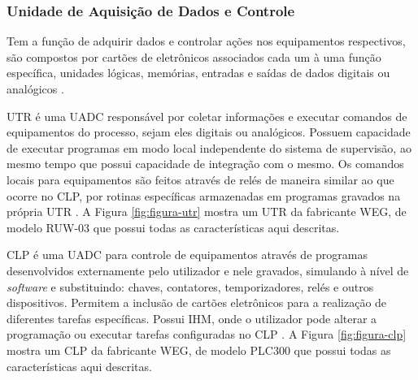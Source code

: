     \subsubsection{Unidade de Aquisição de Dados e Controle}
    \label{sec:uadc}

        Tem a função de adquirir dados e controlar ações nos equipamentos respectivos, são compostos por cartões de eletrônicos associados cada um à uma função específica, unidades lógicas, memórias,  entradas e saídas de dados digitais ou analógicos \cite{mamede-instalacoes}.
        
    \label{sec:utr}

       \gls{UTR} é uma \gls{UADC} responsável por coletar informações e executar comandos de equipamentos do processo, sejam eles digitais ou analógicos. Possuem capacidade de executar programas em modo local independente do sistema de supervisão, ao mesmo tempo que possui capacidade de integração com o mesmo. Os comandos locais para equipamentos são feitos através de relés de maneira similar ao que ocorre no \gls{CLP}, por rotinas específicas armazenadas em programas gravados na própria \gls{UTR} \cite{mamede-instalacoes}. A Figura \ref{fig:figura-utr} mostra um \gls{UTR} da fabricante WEG, de modelo RUW-03 que possui todas as características aqui descritas.
       
        \begin{figure}[!h]
	    \end{figure}
       
    \label{sec:clp}

       \gls{CLP} é uma \gls{UADC} para controle de equipamentos através de programas desenvolvidos externamente pelo utilizador e nele gravados, simulando à nível de \textit{software} e substituindo: chaves, contatores, temporizadores, relés e outros dispositivos. Permitem a inclusão de cartões eletrônicos para a realização de diferentes tarefas específicas. Possui \gls{IHM}, onde o utilizador pode alterar a programação ou executar tarefas configuradas no \gls{CLP} \cite{mamede-instalacoes}. A Figura \ref{fig:figura-clp} mostra um \gls{CLP} da fabricante WEG, de modelo PLC300 que possui todas as características aqui descritas.
       
